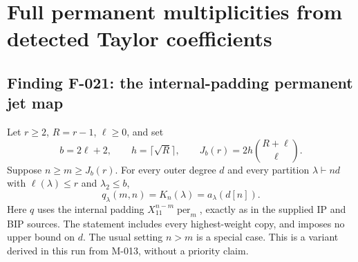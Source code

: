 \section{Full permanent multiplicities from detected Taylor coefficients}

\subsection*{Finding F-021: the internal-padding permanent jet map}
Let \(r\geq2\), \(R=r-1\), \(\ell\geq0\), and set
\[
 b=2\ell+2,\qquad h=\lceil\sqrt R\rceil,\qquad
 J_b(r)=2h\binom{R+\ell}{\ell}.
\]
Suppose \(n\geq m\geq J_b(r)\). For every outer degree
\(d\) and every partition \(\lambda\vdash nd\) with
\(\ell(\lambda)\leq r\) and \(\lambda_2\leq b\),
\begin{equation}\label{eq:F021}
 q_\lambda(m,n)=K_n(\lambda)=a_\lambda(d[n]).
\end{equation}
Here \(q\) uses the internal padding
\(X_{11}^{n-m}\operatorname{per}_m\), exactly as in the
supplied IP and BIP sources. The statement includes every
highest-weight copy, and imposes no upper bound on \(d\).
The usual setting \(n>m\) is a special case. This is a
variant derived in this run from M-013, without a priority claim.


